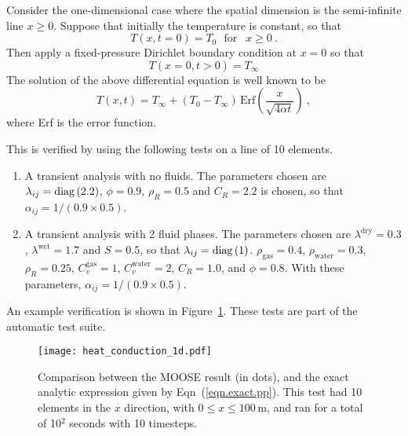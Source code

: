 Consider the one-dimensional case where the spatial dimension is the
semi-infinite line $x\geq 0$.  Suppose that initially the temperature is
constant, so that
\begin{equation}
T(x, t=0) = T_{0} \ \ \ \mbox{for }\ \ x\geq 0 \ .
\end{equation}
Then apply a fixed-pressure Dirichlet boundary condition at $x=0$ so
that
\begin{equation}
T(x=0, t>0) = T_{\infty}
\end{equation}
The solution of the above differential equation is well known to be
\begin{equation}
T(x, t) = T_{\infty} + (T_{0} -
T_{\infty})\,\mbox{Erf}\left( \frac{x}{\sqrt{4\alpha t}} \right) \ ,
\label{eqn.exact.pp}
\end{equation}
where Erf is the error function.

This is verified by using the following tests on a line of 10 elements.
\begin{enumerate}
\item A transient analysis with no fluids.  The parameters chosen are $\lambda_{ij} =
  \mathrm{diag}\,(2.2)$, $\phi=0.9$, $\rho_{R}=0.5$ and $C_{R}=2.2$ is chosen,
  so that $\alpha_{ij} = 1/(0.9\times 0.5)$.
\item A transient analysis with 2 fluid phases.  The parameters chosen
  are $\lambda^{\mathrm{dry}}=0.3$, $\lambda^{\mathrm{wet}} = 1.7$ and
  $S=0.5$, so that $\lambda_{ij} = \mathrm{diag}\,(1)$.  $\rho_{\mathrm{gas}} =
  0.4$, $\rho_{\mathrm{water}} = 0.3$, $\rho_{R}=0.25$, $C_{v}^{\mathrm{gas}} = 1$,
  $C_{v}^{\mathrm{water}}=2$, $C_{R}=1.0$, and $\phi=0.8$.  With these
  parameters, $\alpha_{ij} = 1/(0.9\times 0.5)$.
\end{enumerate}
An example verification is shown in Figure~\ref{heat_conduction.fig}.
These tests are part of the automatic test suite.

\begin{figure}[htb]
\centering
\texttt{[image: heat\_conduction\_1d.pdf]}
\caption{Comparison between the MOOSE result (in dots), and the
  exact analytic expression given by Eqn~(\ref{eqn.exact.pp}).  This
  test had 10 elements in the $x$ direction, with $0\leq x \leq
  100$\,m, and ran for a total of
  10$^2$ seconds with 10 timesteps.}
\label{heat_conduction.fig}
\end{figure}
